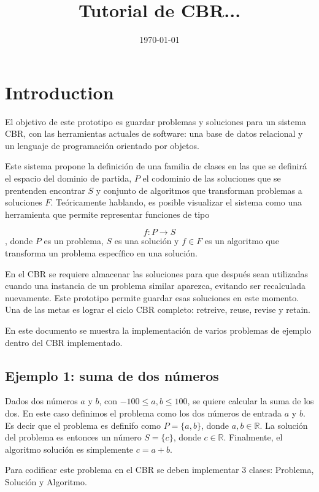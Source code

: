 \documentclass[11pt]{article}
\title{\textbf{Tutorial de CBR...}}
\date{\today}
\begin{document}
\maketitle


\section{Introduction}

El objetivo de este prototipo es guardar problemas y soluciones para un sistema CBR, con las herramientas actuales de software: una base de datos relacional y un lenguaje de programación orientado por objetos. 

Este sistema propone la definición de una familia de clases en las que se definirá el espacio del dominio de partida, $P$ el codominio de las soluciones que se prentenden encontrar $S$ y conjunto de algoritmos que transforman problemas a soluciones $F$. Teóricamente hablando, es posible visualizar el sistema como una herramienta que permite representar funciones de tipo

\[f:P \to S\]
, donde $P$ es un problema, $S$ es una solución y $f \in F$ es un algoritmo que transforma un problema específico en una solución.

En el CBR se requiere almacenar las soluciones para que después sean utilizadas cuando una instancia de un problema similar aparezca, evitando ser recalculada nuevamente. Este prototipo permite guardar esas soluciones en este momento. Una de las metas es lograr el ciclo CBR completo: retreive, reuse, revise y retain. 

En este documento se muestra la implementación de varios problemas de ejemplo dentro del CBR implementado.

\subsection{Ejemplo 1: suma de dos números}

Dados dos números $a$ y $b$, con $-100 \leq a,b \leq 100$, se quiere calcular la suma de los dos. En este caso definimos el problema como los dos números de entrada $a$ y $b$. Es decir que el problema es definifo como $P = \{ a, b \} $, donde $a, b \in \mathbb{R}$. La solución del problema es entonces un número $S = \{ c \}$, donde $c \in \mathbb{R}$. Finalmente, el algoritmo solución es simplemente $c=a + b$.

Para codificar este problema en el CBR se deben implementar 3 clases: Problema, Solución y Algoritmo. 
\end{document}
